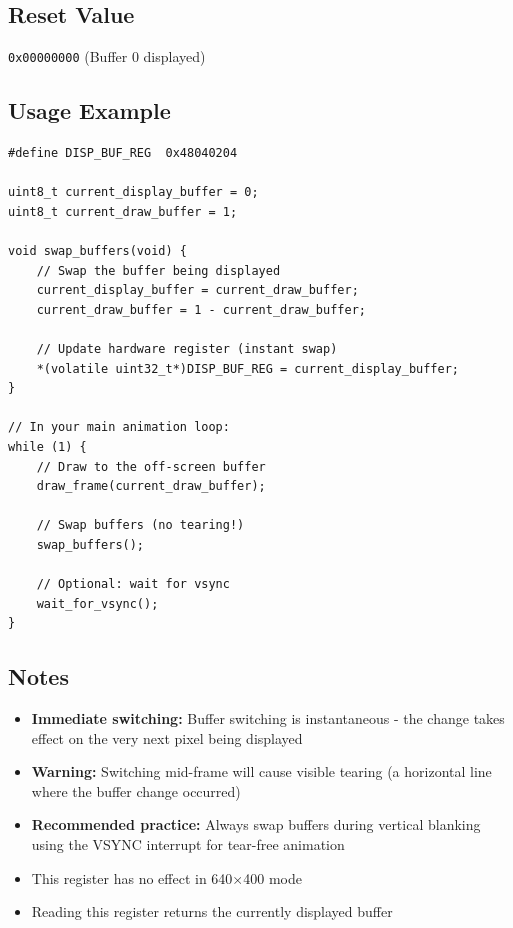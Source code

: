 \documentclass[11pt,letterpaper]{report}
\begin{document}
\subsection{Reset Value}

\texttt{0x00000000} (Buffer 0 displayed)

\subsection{Usage Example}

\begin{lstlisting}[style=c,caption={Double-Buffering Example}]
#define DISP_BUF_REG  0x48040204

uint8_t current_display_buffer = 0;
uint8_t current_draw_buffer = 1;

void swap_buffers(void) {
    // Swap the buffer being displayed
    current_display_buffer = current_draw_buffer;
    current_draw_buffer = 1 - current_draw_buffer;
    
    // Update hardware register (instant swap)
    *(volatile uint32_t*)DISP_BUF_REG = current_display_buffer;
}

// In your main animation loop:
while (1) {
    // Draw to the off-screen buffer
    draw_frame(current_draw_buffer);
    
    // Swap buffers (no tearing!)
    swap_buffers();
    
    // Optional: wait for vsync
    wait_for_vsync();
}
\end{lstlisting}

\subsection{Notes}

\begin{itemize}
    \item \textbf{Immediate switching:} Buffer switching is instantaneous - the change takes effect on the very next pixel being displayed
    \item \textbf{Warning:} Switching mid-frame will cause visible tearing (a horizontal line where the buffer change occurred)
    \item \textbf{Recommended practice:} Always swap buffers during vertical blanking using the VSYNC interrupt for tear-free animation
    \item This register has no effect in 640$\times$400 mode
    \item Reading this register returns the currently displayed buffer
\end{itemize}
\end{document}
